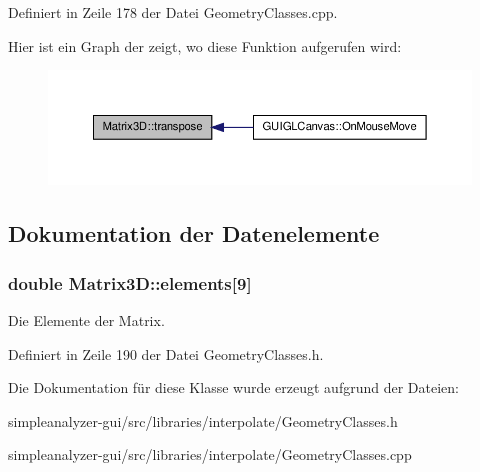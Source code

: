 Definiert in Zeile 178 der Datei Geometry\-Classes.\-cpp.



Hier ist ein Graph der zeigt, wo diese Funktion aufgerufen wird\-:\nopagebreak
\begin{figure}[H]
\begin{center}
\leavevmode
\includegraphics[width=350pt]{classMatrix3D_a0d59cb6ea927264477a10b9d427966d6_icgraph}
\end{center}
\end{figure}




\subsection{Dokumentation der Datenelemente}
\hypertarget{classMatrix3D_aa24b85b09060684ec1559f22857ccfee}{
\subsubsection[{elements}]{\setlength{\rightskip}{0pt plus 5cm}double Matrix3\-D\-::elements\mbox{[}9\mbox{]}\hspace{0.3cm}{\ttfamily [private]}}}\label{classMatrix3D_aa24b85b09060684ec1559f22857ccfee}
Die Elemente der Matrix. 

Definiert in Zeile 190 der Datei Geometry\-Classes.\-h.



Die Dokumentation für diese Klasse wurde erzeugt aufgrund der Dateien\-:\begin{DoxyCompactItemize}
\item 
simpleanalyzer-\/gui/src/libraries/interpolate/Geometry\-Classes.\-h\item 
simpleanalyzer-\/gui/src/libraries/interpolate/Geometry\-Classes.\-cpp\end{DoxyCompactItemize}
